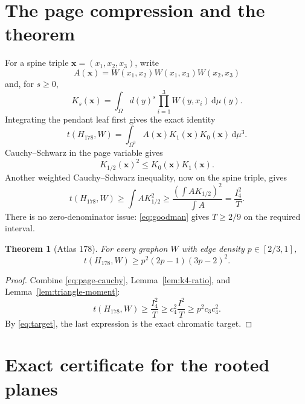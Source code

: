 \documentclass[11pt]{article}
\newtheorem{theorem}{Theorem}[section]
\newcommand{\dd}{\,\mathrm d}
\begin{document}
\section{The page compression and the theorem}

For a spine triple \(\boldsymbol x=(x_1,x_2,x_3)\), write
\[
 A(\boldsymbol x)=
 W(x_1,x_2)W(x_1,x_3)W(x_2,x_3)
\]
and, for \(s\geq0\),
\[
 K_s(\boldsymbol x)=
 \int_\Omega
 d(y)^s\prod_{i=1}^3W(y,x_i)\dd\mu(y).
\]
Integrating the pendant leaf first gives the exact identity
\begin{equation}
 t(H_{178},W)=\int_{\Omega^3}A(\boldsymbol x)
 K_1(\boldsymbol x)K_0(\boldsymbol x)\dd\mu^3.
 \label{eq:page-identity}
\end{equation}
Cauchy--Schwarz in the page variable gives
\[
 K_{1/2}(\boldsymbol x)^2
 \leq K_0(\boldsymbol x)K_1(\boldsymbol x).
\]
Another weighted Cauchy--Schwarz inequality, now on the spine triple, gives
\begin{equation}
 t(H_{178},W)
 \geq\int A K_{1/2}^2
 \geq\frac{(\int A K_{1/2})^2}{\int A}
 =\frac{I_4^2}{T}.
 \label{eq:page-cauchy}
\end{equation}
There is no zero-denominator issue: \eqref{eq:goodman} gives
\(T\geq2/9\) on the required interval.

\begin{theorem}[Atlas 178]\label{thm:atlas178}
For every graphon \(W\) with edge density \(p\in[2/3,1]\),
\[
 t(H_{178},W)\geq p^2(2p-1)(3p-2)^2.
\]
\end{theorem}

\begin{proof}
Combine \eqref{eq:page-cauchy}, Lemma~\ref{lem:k4-ratio}, and
Lemma~\ref{lem:triangle-moment}:
\[
 t(H_{178},W)
 \geq\frac{I_4^2}{T}
 \geq c_4^2\frac{I^2}{T}
 \geq p^2c_3c_4^2.
\]
By \eqref{eq:target}, the last expression is the exact chromatic target.
\end{proof}

\section{Exact certificate for the rooted planes}
\label{sec:certificate}
\end{document}
